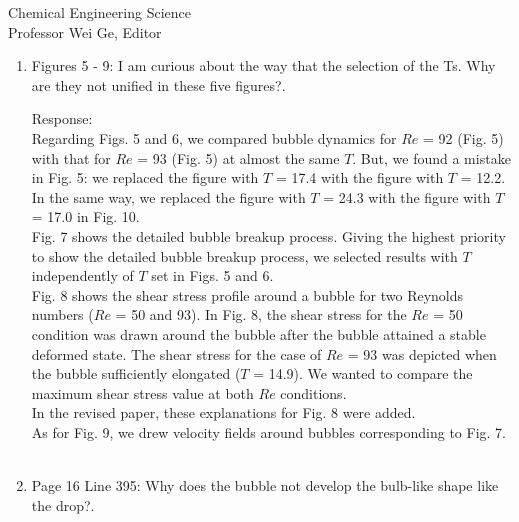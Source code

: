 \documentclass{letter}
\begin{document}
\begin{letter}{
Chemical Engineering Science\\
Professor Wei Ge, Editor\\}
\begin{enumerate}
Response: \\
We agree with the reviewer's suggestion. We added results at $T$ = 40.1, 50.0, and 56.7 to the drop status for $Re$ = 1.0 in Fig. 4.
As can be seen from new Fig. 4, a drop remains a stable deformed state after $T$ = 35.0. In the revised paper, such a comment was added.\\
\\
Please confirm lines 380 to 381.
\\

\par\noindent
\item
\textsf
{Figures 5 - 9: I am curious about the way that the selection of the Ts. Why are they not unified in these five figures?.}
\vspace{3 mm}

Response: \\
Regarding Figs. 5 and 6, we compared bubble dynamics for $Re$ = 92 (Fig. 5) with that for $Re$ = 93 (Fig. 5) at almost the same $T$.
But, we found a mistake in Fig. 5: we replaced the figure with $T$ = 17.4 with the figure with $T$ = 12.2.
In the same way, we replaced the figure with $T$ = 24.3 with the figure with $T$ = 17.0 in Fig. 10. \\

Fig. 7 shows the detailed bubble breakup process. Giving the highest priority to show the detailed bubble breakup process, we selected 
results with $T$ independently of $T$ set in Figs. 5 and 6.\\

Fig. 8 shows the shear stress profile around a bubble for two Reynolds numbers ($Re$ = 50 and 93). In Fig. 8, the shear stress for the 
$Re$ = 50 condition was drawn around the bubble after the bubble attained a stable deformed state.
The shear stress for the case of $Re$ = 93 was depicted when the bubble sufficiently elongated ($T$ = 14.9).
We wanted to compare the maximum shear stress value at both $Re$ conditions. \\
In the revised paper, these explanations for Fig. 8 were added.\\

As for Fig. 9, we drew velocity fields around bubbles corresponding to Fig. 7.\\
\\

\par\noindent
\item
\textsf
{Page 16 Line 395: Why does the bubble not develop the bulb-like shape like the drop?.}
\vspace{3 mm}


\end{enumerate}
\end{letter}
\end{document}

